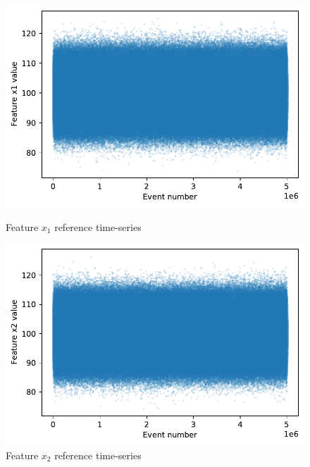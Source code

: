\begin{figure}[!htb] 
  \begin{minipage}[b]{0.5\linewidth}
    \centering
    \includegraphics[width=1\linewidth]{figures/timeseries-r6-x1.pdf} 
    \caption{Feature $x_1$ reference time-series} 
    \label{fig:timeseries-r6-x1} 
    \vspace{4ex}
  \end{minipage}%
  \begin{minipage}[b]{0.5\linewidth}
    \centering
    \includegraphics[width=1\linewidth]{figures/timeseries-r6-x2.pdf} 
    \caption{Feature $x_2$ reference time-series} 
    \label{fig:timeseries-r6-x2} 
    \vspace{4ex}
  \end{minipage} 
  \begin{minipage}[b]{0.5\linewidth}
    \centering

\end{minipage}
\end{figure}
